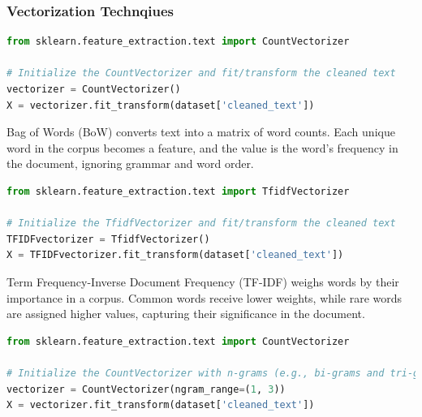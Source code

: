 
\subsubsection{Vectorization Technqiues}

\begin{tcolorbox}[colback=gray!5!white, colframe=gray!80!black, boxrule=0.5pt, title=Bag of Words]
\begin{lstlisting}[language=Python]
from sklearn.feature_extraction.text import CountVectorizer

# Initialize the CountVectorizer and fit/transform the cleaned text
vectorizer = CountVectorizer()
X = vectorizer.fit_transform(dataset['cleaned_text'])
\end{lstlisting}
\end{tcolorbox}

\noindent
Bag of Words (BoW) converts text into a matrix of word counts. Each unique word in the corpus becomes a feature, and the value is the word's frequency in the document, ignoring grammar and word order.

\begin{tcolorbox}[colback=gray!5!white, colframe=gray!80!black, boxrule=0.5pt, title=TF-IDF]
\begin{lstlisting}[language=Python]
from sklearn.feature_extraction.text import TfidfVectorizer

# Initialize the TfidfVectorizer and fit/transform the cleaned text
TFIDFvectorizer = TfidfVectorizer()
X = TFIDFvectorizer.fit_transform(dataset['cleaned_text'])
\end{lstlisting}
\end{tcolorbox}

\noindent
Term Frequency-Inverse Document Frequency (TF-IDF) weighs words by their importance in a corpus. Common words receive lower weights, while rare words are assigned higher values, capturing their significance in the document.

\begin{tcolorbox}[colback=gray!5!white, colframe=gray!80!black, boxrule=0.5pt, title=N-Gram]
\begin{lstlisting}[language=Python]
from sklearn.feature_extraction.text import CountVectorizer

# Initialize the CountVectorizer with n-grams (e.g., bi-grams and tri-grams)
vectorizer = CountVectorizer(ngram_range=(1, 3))
X = vectorizer.fit_transform(dataset['cleaned_text'])
\end{lstlisting}
\end{tcolorbox}
    
